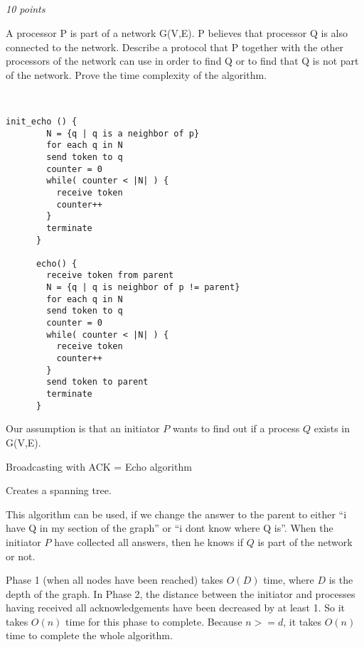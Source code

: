 \documentclass[a4paper]{article}
\newcommand{\points}[1]{\subsection{} \textit{#1 points}\\}
\newcommand{\question}[2][]{
  \parbox[t]{\textwidth}{
    \ifthenelse{\equal{#1}{}}{}{#1)}
    \parbox[t]{0.95\textwidth}{#2}}\\}
\newcommand{\solution}[2][]{
  \ifthenelse{\equal{#1}{} \or \equal{#1}{a}}{\\[3pt]\textit{Solution: }\\[0.1cm]}{}
  \question[#1]{#2}
}
\begin{document}
\points{10}
\question{
  A processor P is part of a network G(V,E). P believes that processor
  Q is also connected to the network. Describe a protocol that P
  together with the other processors of the network can use in order to
  find Q or to find that Q is not part of the network. Prove the time
  complexity of the algorithm.
}
%
\begin{lrbox}{\userinput}
  \begin{minipage}{\linewidth}
    \begin{lstlisting}[mathescape]
      init_echo () {
        N = {q | q is a neighbor of p}
        for each q in N
        send token to q
        counter = 0
        while( counter < |N| ) {
          receive token
          counter++
        }
        terminate
      }

      echo() {
        receive token from parent
        N = {q | q is neighbor of p != parent}
        for each q in N
        send token to q
        counter = 0
        while( counter < |N| ) {
          receive token
          counter++
        }
        send token to parent
        terminate
      }
    \end{lstlisting}
  \end{minipage}
\end{lrbox}
%
\solution{
  Our assumption is that an initiator $P$ wants to find out if a
  process $Q$ exists in G(V,E).


  Broadcasting with ACK = Echo algorithm

  Creates a spanning tree.

  \usebox{\userinput}

  This algorithm can be used, if we change the answer to the parent to
  either ``i have Q in my section of the graph'' or ``i dont know
  where Q is''.
  When the initiator $P$ have collected all answers, then he knows if
  $Q$ is part of the network or not.

  Phase 1 (when all nodes have been reached) takes $O(D)$ time, where
  $D$ is the depth of the graph. In Phase 2, the distance between the
  initiator and processes having received all acknowledgements have been
  decreased by at least 1. So it takes $O(n)$ time for this phase to complete.
  Because $ n >= d $, it takes $O(n)$ time to complete the whole
  algorithm.
}
\end{document}
